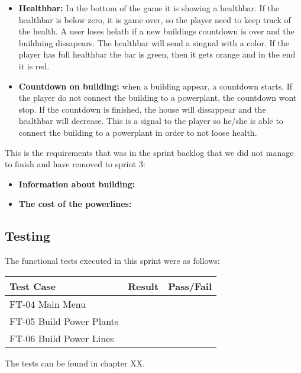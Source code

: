 \begin{itemize}
		\item {\bf Healthbar:} In the bottom of the game it is showing a healthbar. If the 
		healthbar is below zero, it is game over, so the player need to keep track of the health.
		A user loses helath if a new buildings countdown is over and the buildning dissapears.
		The healthbar will send a singnal with a color. If the player has full healthbar the bar is
		green, then it gets orange and in the end it is red. 

		\item {\bf Countdown on building:} when a building appear, a countdown starts. If the player
		do not connect the building to a powerplant, the countdown wont stop. If the countdown is
		finished, the house will dissappear and the healthbar will decrease. This is a signal to
		the player so he/she is able to connect the building to a powerplant in order to not loose
		health. 

	\end{itemize}

	This is the requirements that was in the sprint backlog that we did not
	manage to finish and have removed to sprint 3:

	\begin{itemize}
		\item {\bf Information about building:}

		\item {\bf The cost of the powerlines:}

	\end{itemize}

\subsection{Testing}

	The functional tests executed in this sprint were as follows:


	\begin{tabular}{| l | l | l |}
		\hline
		\rowcolor{lightgray}
		{\bf Test Case} & {\bf Result} & {\bf Pass/Fail} \\ \hline
	  	FT-04 Main Menu & & \\ \hline
		FT-05 Build Power Plants & & \\ \hline
		FT-06 Build Power Lines & & \\ \hline
	\end{tabular}

	The tests can be found in chapter XX.

